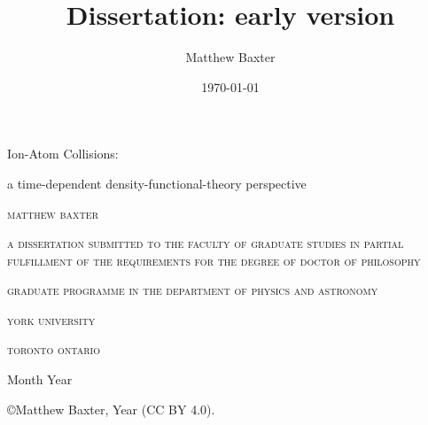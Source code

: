 \documentclass[letterpaper, 11 pt]{report}
\title{Dissertation: early version}
\author{Matthew Baxter}
\date{\today}
\begin{document}

\begin{titlepage}

   \centering

   {\Huge Ion-Atom Collisions:}

   {\large a time-dependent density-functional-theory perspective}

   \vspace{2 cm}

   \textsc{matthew baxter}

   \vspace{2 cm}

   \textsc{a dissertation submitted to the faculty of graduate studies in partial fulfillment of the
           requirements for the degree of doctor of philosophy}

   \vspace{2 cm}

   \textsc{graduate programme in the department of physics and astronomy}

   \textsc{york university}

   \textsc{toronto ontario}

   Month Year

   \vspace{3.5 cm}

   \copyright Matthew Baxter, Year (\textsc{CC BY} 4.0).

   \thispagestyle{empty}

\end{titlepage}

\cleardoublepage
{}
{}
\end{document}
